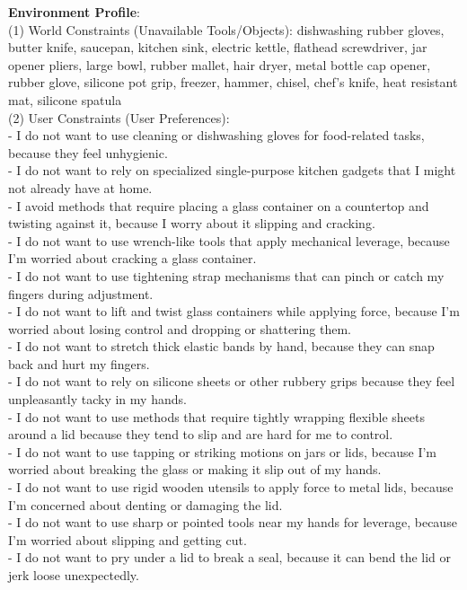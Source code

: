 \begin{tcolorbox}
\textbf{Environment Profile}:\\
(1) World Constraints (Unavailable Tools/Objects): dishwashing rubber gloves, butter knife, saucepan, kitchen sink, electric kettle, flathead screwdriver, jar opener pliers, large bowl, rubber mallet, hair dryer, metal bottle cap opener, rubber glove, silicone pot grip, freezer, hammer, chisel, chef's knife, heat resistant mat, silicone spatula\\
(2) User Constraints (User Preferences):\\
- I do not want to use cleaning or dishwashing gloves for food-related tasks, because they feel unhygienic.\\
- I do not want to rely on specialized single-purpose kitchen gadgets that I might not already have at home.\\
- I avoid methods that require placing a glass container on a countertop and twisting against it, because I worry about it slipping and cracking.\\
- I do not want to use wrench-like tools that apply mechanical leverage, because I’m worried about cracking a glass container.\\
- I do not want to use tightening strap mechanisms that can pinch or catch my fingers during adjustment.\\
- I do not want to lift and twist glass containers while applying force, because I’m worried about losing control and dropping or shattering them.\\
- I do not want to stretch thick elastic bands by hand, because they can snap back and hurt my fingers.\\
- I do not want to rely on silicone sheets or other rubbery grips because they feel unpleasantly tacky in my hands.\\
- I do not want to use methods that require tightly wrapping flexible sheets around a lid because they tend to slip and are hard for me to control.\\
- I do not want to use tapping or striking motions on jars or lids, because I’m worried about breaking the glass or making it slip out of my hands.\\
- I do not want to use rigid wooden utensils to apply force to metal lids, because I’m concerned about denting or damaging the lid.\\
- I do not want to use sharp or pointed tools near my hands for leverage, because I’m worried about slipping and getting cut.\\
- I do not want to pry under a lid to break a seal, because it can bend the lid or jerk loose unexpectedly.\\

\end{tcolorbox}
